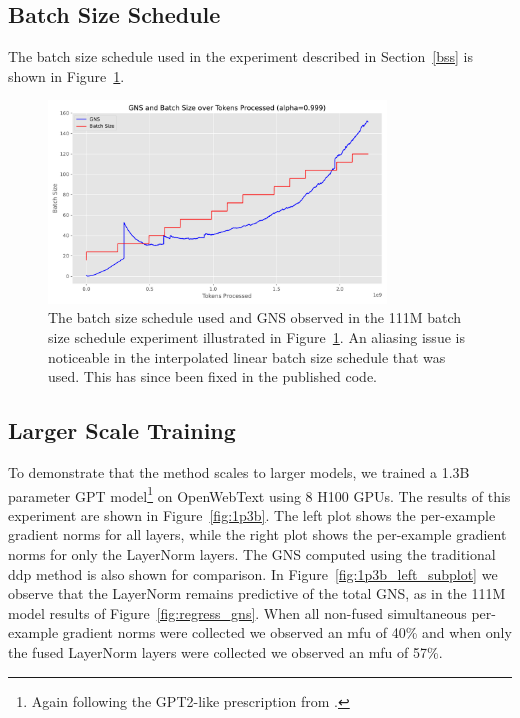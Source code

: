 \documentclass{article}
\begin{document}
\subsection{Batch Size Schedule}\label{app-bss}

The batch size schedule used in the experiment described in Section~\ref{bss} is
shown in Figure~\ref{fig:111M_schedule}.

\begin{figure}
     \centering
     \includegraphics[width=0.8\textwidth]{neurips2024rebuttals/bs_plot/bs_schedule.pdf}
     \caption{%
         The batch size schedule used and GNS observed in the 111M batch size
         schedule experiment illustrated in Figure~\ref{fig:111M_schedule}. An
         aliasing issue is noticeable in the interpolated linear batch size
         schedule that was used. This has since been fixed in the published
         code.}
     \label{fig:111M_schedule}
\end{figure}


\subsection{Larger Scale Training}\label{app-larger}

To demonstrate that the method scales to larger models, we trained a 1.3B
parameter GPT
model\footnote{Again following the GPT2-like\citep{radford2019language} prescription from \citet{dey2023cerebrasgpt}.}
on OpenWebText using 8 H100 GPUs. The results of this
experiment are shown in Figure~\ref{fig:1p3b}. The left plot shows the
per-example gradient norms for all layers, while the right plot shows the
per-example gradient norms for only the LayerNorm layers. The GNS computed using
the traditional \ac{ddp} method is also shown for comparison. In
Figure~\ref{fig:1p3b_left_subplot} we observe that the LayerNorm remains
predictive of the total GNS, as in the 111M model results of
Figure~\ref{fig:regress_gns}. When all non-fused simultaneous per-example
gradient norms were collected we observed an \ac{mfu} of 40\% and when only the fused
LayerNorm layers were collected we observed an \ac{mfu} of 57\%.
\end{document}
